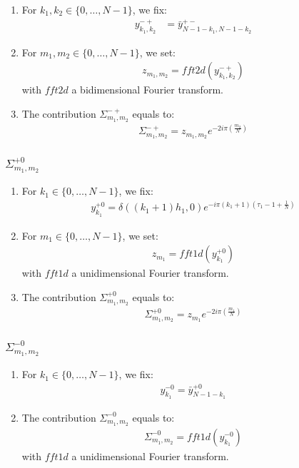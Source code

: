 \begin{enumerate}
\item For $k_1,k_2\in\{0,\hdots,N-1\}$, we fix:
\begin{align*}
y^{-+}_{k_1,k_2}&=\bar{y}^{+-}_{N-1-k_1,N-1-k_2}
\end{align*}
\item For $m_1,m_2\in\{0,\hdots,N-1\}$, we set:
\begin{align*}
  z_{m_1,m_2}=fft2d(y^{-+}_{k_1,k_2})
\end{align*}
with $fft2d$ a bidimensional Fourier transform.
\item The contribution $\Sigma_{m_1,m_2}^{-+}$ equals to:
\begin{align*}
  \Sigma_{m_1,m_2}^{-+}=z_{m_1,m_2} e^{-2i\pi\left(\frac{m_2}{N}\right)}
\end{align*}
\end{enumerate}


\subsubsection{\texorpdfstring{$\Sigma_{m_1,m_2}^{+0}$}{sigma+0}}
\begin{enumerate}
\item For $k_1\in\{0,\hdots,N-1\}$, we fix:
\begin{align*}
y^{+0}_{k_1}= \delta((k_1+1)h_1,0)e^{-i\pi (k_1+1)\left(\tau_1-1+\frac{1}{N}\right)}
\end{align*}
\item For $m_1\in\{0,\hdots,N-1\}$, we set:
\begin{align*}
  z_{m_1}=fft1d(y^{+0}_{k_1})
\end{align*}
with $fft1d$ a unidimensional Fourier transform.
\item The contribution $\Sigma_{m_1,m_2}^{+0}$ equals to:
\begin{align*}
  \Sigma_{m_1,m_2}^{+0}=z_{m_1} e^{-2i\pi\left(\frac{m_1}{N}\right)}
\end{align*}
\end{enumerate}

\subsubsection{\texorpdfstring{$\Sigma_{m_1,m_2}^{-0}$}{sigma-0}}
\begin{enumerate}
\item For $k_1\in\{0,\hdots,N-1\}$, we fix:
\begin{align*}
y^{-0}_{k_1}= \bar{y}^{+0}_{N-1-k_1}
\end{align*}
\item The contribution $\Sigma_{m_1,m_2}^{-0}$ equals to:
\begin{align*}
  \Sigma_{m_1,m_2}^{-0}=fft1d(y^{-0}_{k_1})
\end{align*}
with $fft1d$ a unidimensional Fourier transform.
\end{enumerate}

